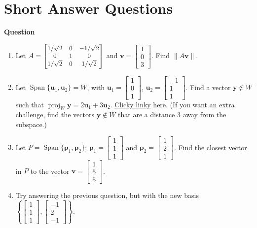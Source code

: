 \documentclass[10pt, titlepage]{article}
\newcounter{question}
\newenvironment{newquestion}
{
	\noindent\textbf{Question \thequestion}
}
{
\stepcounter{question}
\par
}
\renewcommand{\vec}[1]{\bm{#1}}
\DeclareMathOperator{\vspan}{Span}
\DeclareMathOperator{\proj}{proj}
\begin{document}
	\section{\centering Short Answer Questions}
	\begin{newquestion}
		\begin{enumerate}
			\item Let \(A = \small \begin{bmatrix}1/\sqrt{2} & 0 & -1/\sqrt{2}\\ 0 & 1 & 0\\ 1/\sqrt{2} & 0 & 1/\sqrt{2}\end{bmatrix}\) and 
			      \(\vec{v} = \begin{bmatrix}1 \\ 0 \\ 3\end{bmatrix}\). Find \(\|A\vec{v}\|\).
			\item Let \(\vspan\{\vec{u}_1, \vec{u}_2\} = W\), with \(\vec{u}_1 = \begin{bmatrix}1 \\ 0 \\ 1\end{bmatrix}\), 
			      \(\vec{u}_2 = \begin{bmatrix}-1 \\ 1 \\ 1\end{bmatrix}\). Find a vector \(\vec{y} \notin W\) such that
		              \(\proj_W \vec{y} = 2\vec{u}_1 + 3\vec{u}_2\). \href{https://www.desmos.com/calculator/a6xmnphvbp}{Clicky linky} here.
				(If you want an extra challenge, find the vectors \(\vec{y} \notin W\) that are a distance 3 away from the subspace.)
			\item Let \(P = \vspan \{\vec{p}_1, \vec{p}_2\}\); \(\vec{p}_1 = \begin{bmatrix}1 \\ 1 \\ 1\end{bmatrix}\)
			      and \(\vec{p}_2 = \begin{bmatrix}1 \\ 2 \\ 1\end{bmatrix}\). Find the closest vector in \(P\) to the vector 
			      \(\vec{v} = \begin{bmatrix}1 \\ 5 \\ 5\end{bmatrix}\).
			\item Try answering the previous question, but with the new basis 
			      \(\left\{\begin{bmatrix}1 \\ 1 \\ 1\end{bmatrix}, \begin{bmatrix}-1 \\ 2 \\ -1\end{bmatrix}\right\}\).
		\end{enumerate}
	\end{newquestion}

\end{document}
